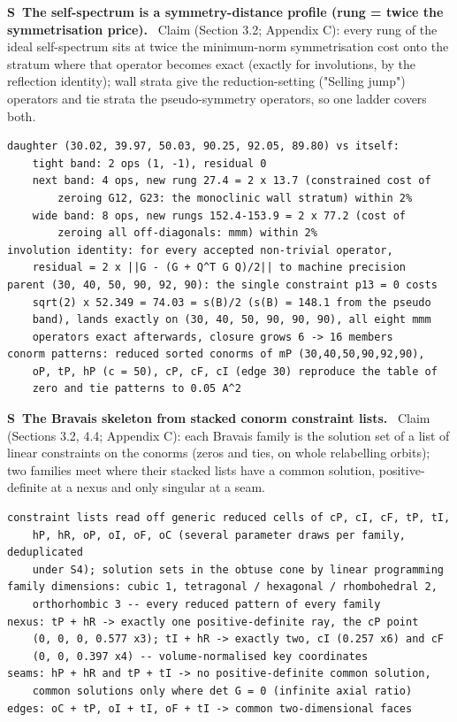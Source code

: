 \documentclass[11pt]{article}
\newcounter{scheck}
\renewcommand{\thescheck}{S\arabic{scheck}}
\newcommand{\sitem}[2]{\medskip\noindent\refstepcounter{scheck}\label{#1}\textbf{\thescheck\ #2.}\ }
\begin{document}
\sitem{z:sym-profile}{The self-spectrum is a symmetry-distance profile (rung = twice the symmetrisation price)}
Claim (Section 3.2; Appendix C): every rung of the ideal self-spectrum sits at twice the minimum-norm symmetrisation cost onto the stratum where that operator becomes exact (exactly for involutions, by the reflection identity); wall strata give the reduction-setting ("Selling jump") operators and tie strata the pseudo-symmetry operators, so one ladder covers both.
\begin{footnotesize}\begin{verbatim}
daughter (30.02, 39.97, 50.03, 90.25, 92.05, 89.80) vs itself:
    tight band: 2 ops (1, -1), residual 0
    next band: 4 ops, new rung 27.4 = 2 x 13.7 (constrained cost of
        zeroing G12, G23: the monoclinic wall stratum) within 2%
    wide band: 8 ops, new rungs 152.4-153.9 = 2 x 77.2 (cost of
        zeroing all off-diagonals: mmm) within 2%
involution identity: for every accepted non-trivial operator,
    residual = 2 x ||G - (G + Q^T G Q)/2|| to machine precision
parent (30, 40, 50, 90, 92, 90): the single constraint p13 = 0 costs
    sqrt(2) x 52.349 = 74.03 = s(B)/2 (s(B) = 148.1 from the pseudo
    band), lands exactly on (30, 40, 50, 90, 90, 90), all eight mmm
    operators exact afterwards, closure grows 6 -> 16 members
conorm patterns: reduced sorted conorms of mP (30,40,50,90,92,90),
    oP, tP, hP (c = 50), cP, cF, cI (edge 30) reproduce the table of
    zero and tie patterns to 0.05 A^2
\end{verbatim}\end{footnotesize}

\sitem{z:nexus}{The Bravais skeleton from stacked conorm constraint lists}
Claim (Sections 3.2, 4.4; Appendix C): each Bravais family is the solution set of a list of linear constraints on the conorms (zeros and ties, on whole relabelling orbits); two families meet where their stacked lists have a common solution, positive-definite at a nexus and only singular at a seam.
\begin{footnotesize}\begin{verbatim}
constraint lists read off generic reduced cells of cP, cI, cF, tP, tI,
    hP, hR, oP, oI, oF, oC (several parameter draws per family, deduplicated
    under S4); solution sets in the obtuse cone by linear programming
family dimensions: cubic 1, tetragonal / hexagonal / rhombohedral 2,
    orthorhombic 3 -- every reduced pattern of every family
nexus: tP + hR -> exactly one positive-definite ray, the cP point
    (0, 0, 0, 0.577 x3); tI + hR -> exactly two, cI (0.257 x6) and cF
    (0, 0, 0.397 x4) -- volume-normalised key coordinates
seams: hP + hR and tP + tI -> no positive-definite common solution,
    common solutions only where det G = 0 (infinite axial ratio)
edges: oC + tP, oI + tI, oF + tI -> common two-dimensional faces
\end{verbatim}\end{footnotesize}
\end{document}
